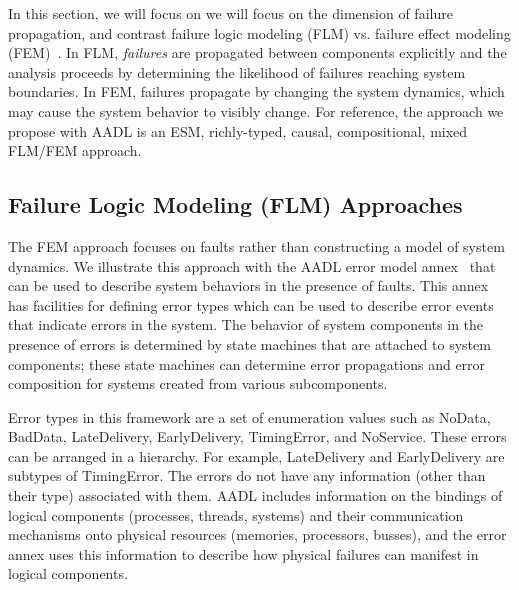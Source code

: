 In this section, we will focus on we will focus on the dimension of failure propagation, and contrast failure logic modeling (FLM) vs. failure effect modeling (FEM)~\cite{5979344}.  In FLM, {\em failures} are propagated between components explicitly and the analysis proceeds by determining the likelihood of failures reaching system boundaries.  In FEM, failures propagate by changing the system dynamics, which may cause the system behavior to visibly change.  For reference, the approach we propose with AADL is an ESM, richly-typed, causal, compositional, mixed FLM/FEM approach.



\subsection{Failure Logic Modeling (FLM) Approaches}




The FEM approach focuses on faults rather than constructing a model of system dynamics. We illustrate this approach with the AADL error model annex~\cite{SAEAS} that can be used to describe system behaviors in the presence of faults. This annex has facilities for defining error types which can be used to describe error events that indicate errors in the system. The behavior of system components in the presence of errors is determined by state machines that are attached to system components; these state machines can determine error propagations and error composition for systems created from various subcomponents.

Error types in this framework are a set of enumeration values such as NoData, BadData, LateDelivery, EarlyDelivery, TimingError, and NoService. These errors can be arranged in a hierarchy. For example, LateDelivery and EarlyDelivery are subtypes of TimingError. The errors do not have any information (other than their type) associated with them. AADL includes information on the bindings of logical components (processes, threads, systems) and their communication mechanisms onto physical resources (memories, processors, busses), and the error annex uses this information to describe how physical failures can manifest in logical components.

